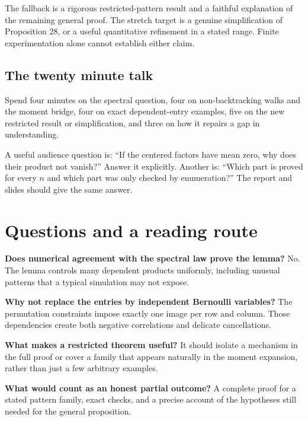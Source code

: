 \documentclass[11pt,letterpaper]{article}
\newcommand{\Page}[1]{\clearpage\section*{#1}}
\newcommand{\Sub}[1]{\subsection*{#1}}
\begin{document}
The fallback is a rigorous restricted-pattern result and a faithful explanation of the remaining general proof. The stretch target is a genuine simplification of Proposition 28, or a useful quantitative refinement in a stated range. Finite experimentation alone cannot establish either claim.

\Sub{The twenty minute talk}
Spend four minutes on the spectral question, four on non-backtracking walks and the moment bridge, four on exact dependent-entry examples, five on the new restricted result or simplification, and three on how it repairs a gap in understanding.

A useful audience question is: ``If the centered factors have mean zero, why does their product not vanish?'' Answer it explicitly. Another is: ``Which part is proved for every $n$ and which part was only checked by enumeration?'' The report and slides should give the same answer.

\Page{Questions and a reading route}
\textbf{Does numerical agreement with the spectral law prove the lemma?} No. The lemma controls many dependent products uniformly, including unusual patterns that a typical simulation may not expose.

\textbf{Why not replace the entries by independent Bernoulli variables?} The permutation constraints impose exactly one image per row and column. Those dependencies create both negative correlations and delicate cancellations.

\textbf{What makes a restricted theorem useful?} It should isolate a mechanism in the full proof or cover a family that appears naturally in the moment expansion, rather than just a few arbitrary examples.

\textbf{What would count as an honest partial outcome?} A complete proof for a stated pattern family, exact checks, and a precise account of the hypotheses still needed for the general proposition.
\end{document}
